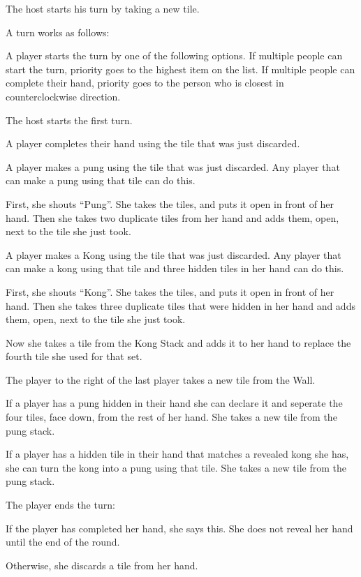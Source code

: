 \documentclass{article}
\begin{document}
The host starts his turn by taking a new tile.

A turn works as follows:
\begin{enumerate*}
    \item A player starts the turn by one of the following options. If multiple people can start the turn, priority goes to the highest item on the list. If multiple people can complete their hand, priority goes to the person who is closest in counterclockwise direction.
    \begin{enumerate*}
        \item The host starts the first turn.
        \item A player completes their hand using the tile that was just discarded.
        \item A player makes a pung using the tile that was just discarded. Any player that can make a pung using that tile can do this.

        First, she shouts ``Pung''. She takes the tiles, and puts it open in front of her hand. Then she takes two duplicate tiles from her hand and adds them, open, next to the tile she just took.
        \item A player makes a Kong using the tile that was just discarded. Any player that can make a kong using that tile and three hidden tiles in her hand can do this.

        First, she shouts ``Kong''. She takes the tiles, and puts it open in front of her hand. Then she takes three duplicate tiles that were hidden in her hand and adds them, open, next to the tile she just took.

        Now she takes a tile from the Kong Stack and adds it to her hand to replace the fourth tile she used for that set.
        \item The player to the right of the last player takes a new tile from the Wall.
    \end{enumerate*}
    \item If a player has a pung hidden in their hand she can declare it and seperate the four tiles, face down, from the rest of her hand. She takes a new tile from the pung stack.
    \item If a player has a hidden tile in their hand that matches a revealed kong she has, she can turn the kong into a pung using that tile. She takes a new tile from the pung stack.
    \item The player ends the turn:
        \begin{enumerate*}
            \item If the player has completed her hand, she says this. She does not reveal her hand until the end of the round.
            \item Otherwise, she discards a tile from her hand.
        \end{enumerate*}
\end{enumerate*}
\end{document}

